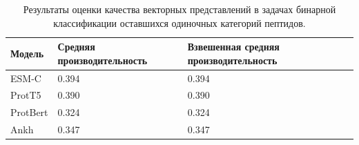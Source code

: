 \documentclass[specification,annotation,times]{itmo-student-thesis}
\begin{document}
\begin{table}[h]
\centering

\caption{Результаты оценки качества векторных представлений в задачах бинарной классификации оставшихся одиночных категорий пептидов.}
\label{tab:compare_results_other}
\begin{tabular}{|p{3cm}|p{5cm}|p{5cm}|}
\hline
Модель & Средняя \newline производительность & Взвешенная \newline средняя \newline производительность \\
\hline
ESM-C & 0.394 & 0.394 \\ \hline
ProtT5 & 0.390 & 0.390 \\ \hline
ProtBert & 0.324 & 0.324 \\ \hline
Ankh & 0.347 & 0.347 \\ \hline
\end{tabular}

\end{table}
\end{document}
